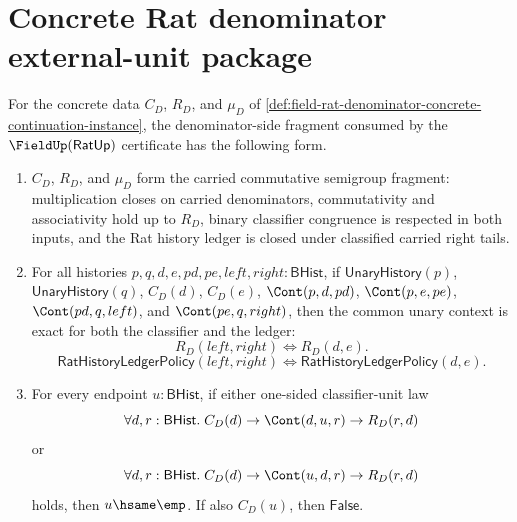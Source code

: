 \section{Concrete Rat denominator external-unit package}
\label{sec:field-rat-denominator-external-unit-package}

\begin{theorem}
\label{thm:field-rat-denominator-concrete-cancellative-unitless-semigroup}
For the concrete data $C_D$, $R_D$, and $\mu_D$ of
\autoref{def:field-rat-denominator-concrete-continuation-instance}, the
denominator-side fragment consumed by the $\FieldUp(\mathsf{RatUp})$
certificate has the following form.
\begin{enumerate}
  \item $C_D$, $R_D$, and $\mu_D$ form the carried commutative semigroup
  fragment: multiplication closes on carried denominators, commutativity and
  associativity hold up to $R_D$, binary classifier congruence is respected in
  both inputs, and the Rat history ledger is closed under classified carried
  right tails.
  \item For all histories $p,q,d,e,pd,pe,left,right:\mathsf{BHist}$, if
  $\mathsf{UnaryHistory}(p)$, $\mathsf{UnaryHistory}(q)$, $C_D(d)$, $C_D(e)$,
  $\Cont(p,d,pd)$, $\Cont(p,e,pe)$, $\Cont(pd,q,left)$, and
  $\Cont(pe,q,right)$, then the common unary context is exact for both the
  classifier and the ledger:
  $$
  R_D(left,right)\Longleftrightarrow R_D(d,e).
  $$
  $$
  \mathsf{RatHistoryLedgerPolicy}(left,right)\Longleftrightarrow
  \mathsf{RatHistoryLedgerPolicy}(d,e).
  $$
  \item For every endpoint $u:\mathsf{BHist}$, if either one-sided
  classifier-unit law
  $$
  \forall d,r:\mathsf{BHist}.\;
  C_D(d)\to
  \Cont(d,u,r)\to
  R_D(r,d)
  $$
  or
  $$
  \forall d,r:\mathsf{BHist}.\;
  C_D(d)\to
  \Cont(u,d,r)\to
  R_D(r,d)
  $$
  holds, then $u\hsame\emp$. If also $C_D(u)$, then $\mathsf{False}$.
\end{enumerate}
\end{theorem}

